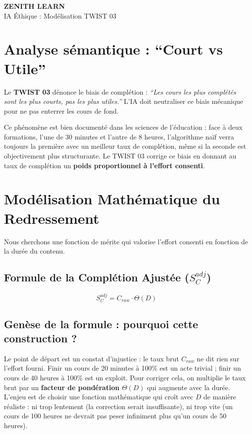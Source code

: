 \documentclass[11pt,a4paper]{article}
\begin{document}
\begin{tcolorbox}[enhanced, colback=BrandDark, colframe=BrandPrimary, arc=10pt, boxrule=2pt, halign=center]
    \vspace{0.3cm}
    {\Huge \bfseries \color{white} ZENITH LEARN} \\
    \vspace{0.2cm}
    {\Large \color{BrandPrimary} IA Éthique : Modélisation TWIST 03} \\
    \vspace{0.3cm}
\end{tcolorbox}

\section{Analyse sémantique : ``Court vs Utile''}
Le \textbf{TWIST 03} dénonce le biais de complétion : \textit{``Les cours les plus complétés sont les plus courts, pas les plus utiles.''} L'IA doit neutraliser ce biais mécanique pour ne pas enterrer les cours de fond.

Ce phénomène est bien documenté dans les sciences de l'éducation : face à deux formations, l'une de 30 minutes et l'autre de 8 heures, l'algorithme naïf verra toujours la première avec un meilleur taux de complétion, même si la seconde est objectivement plus structurante. Le TWIST 03 corrige ce biais en donnant au taux de complétion un \textbf{poids proportionnel à l'effort consenti}.

\section{Modélisation Mathématique du Redressement}
Nous cherchons une fonction de mérite qui valorise l'effort consenti en fonction de la durée du contenu.

\subsection{Formule de la Complétion Ajustée ($S_C^{adj}$)}
\begin{equation}
S_C^{adj} = C_{raw} \cdot \Theta(D)
\end{equation}

\subsection{Genèse de la formule : pourquoi cette construction ?}

Le point de départ est un constat d'injustice : le taux brut $C_{raw}$ ne dit rien sur l'effort fourni. Finir un cours de 20 minutes à 100\% est un acte trivial ; finir un cours de 40 heures à 100\% est un exploit. Pour corriger cela, on multiplie le taux brut par un \textbf{facteur de pondération $\Theta(D)$} qui augmente avec la durée. L'enjeu est de choisir une fonction mathématique qui croît avec $D$ de manière réaliste : ni trop lentement (la correction serait insuffisante), ni trop vite (un cours de 100 heures ne devrait pas peser infiniment plus qu'un cours de 50 heures).
\end{document}
